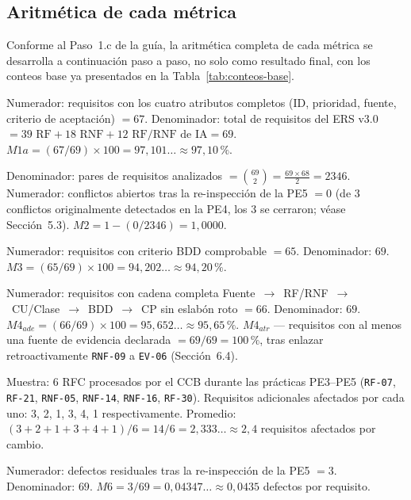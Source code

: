 \documentclass[11pt,a4paper]{article}
\newcommand{\id}[1]{\texttt{#1}}
\begin{document}
\subsection{Aritmética de cada métrica}

Conforme al Paso~1.c de la guía, la aritmética completa de cada métrica se desarrolla a
continuación paso a paso, no solo como resultado final, con los conteos base ya presentados en la
Tabla~\ref{tab:conteos-base}.

\begin{description}[leftmargin=1.6cm,style=nextline]
\item[M1a --- Completitud de atributos.] Numerador: requisitos con los cuatro atributos completos
(ID, prioridad, fuente, criterio de aceptación) $=67$. Denominador: total de requisitos del ERS
v3.0 $=39\text{ RF}+18\text{ RNF}+12\text{ RF/RNF de IA}=69$. $M1a = (67/69)\times100 = 97{,}101\ldots
\approx 97{,}10\,\%$.
\item[M2 --- Consistencia.] Denominador: pares de requisitos analizados $=\binom{69}{2}=
\frac{69\times68}{2}=2346$. Numerador: conflictos abiertos tras la re-inspección de la PE5 $=0$
(de 3 conflictos originalmente detectados en la PE4, los 3 se cerraron; véase Sección~5.3).
$M2 = 1-(0/2346) = 1{,}0000$.
\item[M3 --- Verificabilidad.] Numerador: requisitos con criterio BDD comprobable $=65$.
Denominador: $69$. $M3 = (65/69)\times100 = 94{,}202\ldots \approx 94{,}20\,\%$.
\item[M4$_{ade}$ --- Adecuación de la trazabilidad.] Numerador: requisitos con cadena completa
Fuente~$\to$~RF/RNF~$\to$~CU/Clase~$\to$~BDD~$\to$~CP sin eslabón roto $=66$. Denominador: $69$.
$M4_{ade} = (66/69)\times100 = 95{,}652\ldots \approx 95{,}65\,\%$. $M4_{atr}$ --- requisitos con
al menos una fuente de evidencia declarada $=69/69=100\,\%$, tras enlazar retroactivamente
\id{RNF-09} a \id{EV-06} (Sección~6.4).
\item[M5 --- Modificabilidad.] Muestra: 6 RFC procesados por el CCB durante las prácticas PE3--PE5
(\id{RF-07}, \id{RF-21}, \id{RNF-05}, \id{RNF-14}, \id{RNF-16}, \id{RF-30}). Requisitos adicionales
afectados por cada uno: 3, 2, 1, 3, 4, 1 respectivamente. Promedio: $(3+2+1+3+4+1)/6 = 14/6 =
2{,}333\ldots \approx 2{,}4$ requisitos afectados por cambio.
\item[M6 --- Corrección.] Numerador: defectos residuales tras la re-inspección de la PE5 $=3$.
Denominador: $69$. $M6 = 3/69 = 0{,}04347\ldots \approx 0{,}0435$ defectos por requisito.
\end{description}
\end{document}
